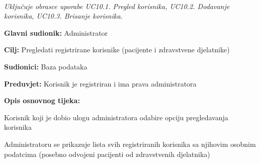 \noindent {}\\
\textit{Uključuje obrasce uporabe UC10.1. Pregled korisnika, UC10.2. Dodavanje korisnika, UC10.3. Brisanje korisnika.}\\

\noindent {}
\begin{packed_item}
	
	\item \textbf{Glavni sudionik: }Administrator
	\item  \textbf{Cilj:} Pregledati registrirane korisnike (pacijente i zdravstvene djelatnike)
	\item  \textbf{Sudionici:} Baza podataka
	\item  \textbf{Preduvjet:} Korisnik je registriran i ima prava administratora
	\item  \textbf{Opis osnovnog tijeka:}
	
	\item[] \begin{packed_enum}
		
		\item Korisnik koji je dobio ulogu administratora odabire opciju pregledavanja korisnika
		\item Administratoru se prikazuje lista svih registriranih korisnika sa njihovim osobnim podatcima (posebno odvojeni pacijenti od zdravstvenih djelatnika)
	\end{packed_enum}
	
\end{packed_item}

